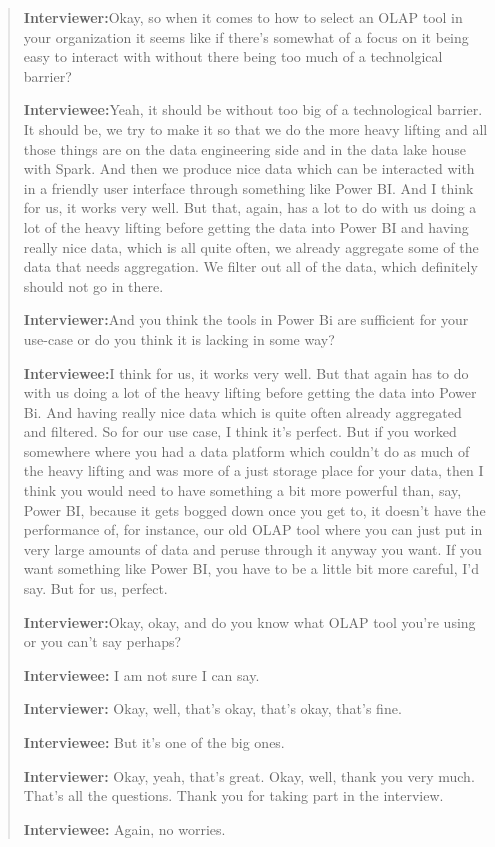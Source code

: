\begin{quote}
    \textbf{Interviewer:}Okay, so when it comes to how to select an OLAP tool in your organization it seems like if there's somewhat of a focus on it being easy to interact with without there being too much of a technolgical barrier?

    \textbf{Interviewee:}Yeah, it should be without too big of a technological barrier.
    It should be, we try to make it so that we do the more heavy lifting and all those things are on the data engineering side and in the data lake house with Spark.
    And then we produce nice data which can be interacted with in a friendly user interface through something like Power BI.
    And I think for us, it works very well.
    But that, again, has a lot to do with us doing a lot of the heavy lifting before getting the data into Power BI
    and having really nice data, which is all quite often,
    we already aggregate some of the data that needs aggregation.
    We filter out all of the data, which definitely should not go in there.

    \textbf{Interviewer:}And you think the tools in Power Bi are sufficient for your use-case or do you think it is lacking in some way?

    \textbf{Interviewee:}I think for us, it works very well. But that again has to do with us doing a lot of the heavy lifting before getting the data into Power Bi. And having really nice data which is quite often already aggregated and filtered. So for our use case, I think it's perfect.
    But if you worked somewhere where you had a data platform which couldn't do as much of the heavy lifting and was more of a just storage place for your data,
    then I think you would need to have something a bit more powerful than, say, Power BI, because it gets bogged down once you get to, it doesn't have the performance of, for instance, our old OLAP tool where you can just put in very large amounts of data and peruse through it anyway you want.
    If you want something like Power BI, you have to be a little bit more careful, I'd say.
    But for us, perfect.

    \textbf{Interviewer:}Okay, okay, and do you know what OLAP tool you're using or you can't say perhaps?

    \textbf{Interviewee:} I am not sure I can say.

    \textbf{Interviewer:} Okay, well, that's okay, that's okay, that's fine.

    \textbf{Interviewee:} But it's one of the big ones.

    \textbf{Interviewer:} Okay, yeah, that's great. Okay, well, thank you very much. That's all the questions. Thank you for taking part in the interview.

    \textbf{Interviewee:} Again, no worries.

\end{quote}